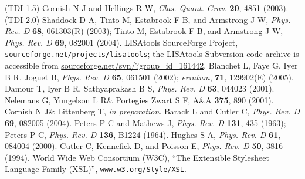 \documentclass[12pt]{iopart}
\begin{document}
\begin{thebibliography}{10}
 (TDI 1.5) Cornish N J and Hellings R W, \emph{Clas. Quant. Grav.} \textbf{20}, 4851 (2003).
 (TDI 2.0) Shaddock D A, Tinto M, Estabrook F B, and Armstrong J W, \emph{Phys. Rev. D} \textbf{68}, 061303(R) (2003); Tinto M, Estabrook F B, and Armstrong J W, \emph{Phys. Rev. D} \textbf{69}, 082001 (2004).
 LISAtools SourceForge Project, \texttt{sourceforge.net/projects/lisatools}; the LISAtools Subversion code archive is accessible from 
\url{sourceforge.net/svn/?group_id=161442}.
 Blanchet L, Faye G, Iyer B R, Joguet B, \emph{Phys. Rev. D} \textbf{65}, 061501 (2002); \emph{erratum}, \textbf{71}, 129902(E) (2005).
 Damour T, Iyer B R, Sathyaprakash B S, \emph{Phys. Rev. D} \textbf{63}, 044023 (2001).
 Nelemans G, Yungelson L R\& Portegies Zwart S F, A\&A {\bf 375}, 890 (2001).
 Cornish N J\& Littenberg T, {\em in preparation}.
 Barack L and Cutler C, \emph{Phys. Rev. D} {\bf 69}, 082005 (2004).
 Peters P C and Mathews J, \emph{Phys. Rev. D} {\bf 131}, 435 (1963);
 Peters P C, \emph{Phys. Rev. D} {\bf 136}, B1224 (1964).
 Hughes S A, \emph{Phys. Rev. D} {\bf 61}, 084004 (2000).
 Cutler C, Kennefick D, and Poisson E, \emph{Phys. Rev. D} {\bf 50}, 3816 (1994).
 World Wide Web Consortium (W3C), ``The Extensible Stylesheet Language Family (XSL)'', \texttt{www.w3.org/Style/XSL}.

\end{thebibliography}
\end{document}
